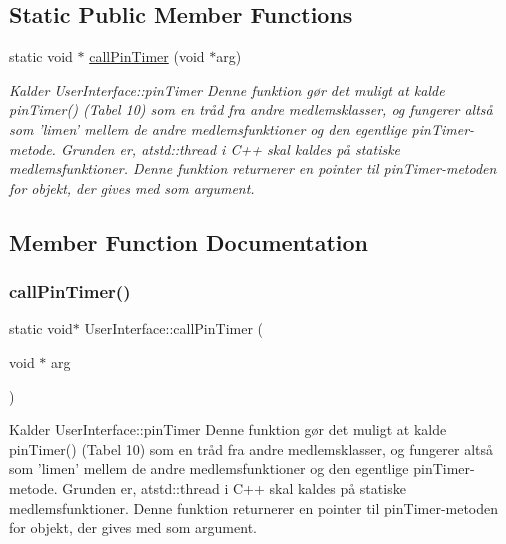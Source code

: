 \subsection*{Static Public Member Functions}
\begin{DoxyCompactItemize}
\item 
static void $\ast$ \hyperlink{classUserInterface_a29bcf3e43b86bda0fcfb9b3bfce93308}{call\+Pin\+Timer} (void $\ast$arg)
\begin{DoxyCompactList}\small\item\em Kalder User\+Interface\+::pin\+Timer Denne funktion gør det muligt at kalde pin\+Timer() (Tabel 10) som en tråd fra andre medlemsklasser, og fungerer altså som ’limen’ mellem de andre medlemsfunktioner og den egentlige pin\+Timer-\/metode. Grunden er, atstd\+::thread i C++ skal kaldes på statiske medlemsfunktioner. Denne funktion returnerer en pointer til pin\+Timer-\/metoden for objekt, der gives med som argument. \end{DoxyCompactList}\end{DoxyCompactItemize}


\subsection{Member Function Documentation}
\mbox{\label{classUserInterface_a29bcf3e43b86bda0fcfb9b3bfce93308}} 
\subsubsection{\texorpdfstring{call\+Pin\+Timer()}{callPinTimer()}}
{\footnotesize\ttfamily static void$\ast$ User\+Interface\+::call\+Pin\+Timer (\begin{DoxyParamCaption}\item[{void $\ast$}]{arg }\end{DoxyParamCaption})\hspace{0.3cm}{\ttfamily [static]}}



Kalder User\+Interface\+::pin\+Timer Denne funktion gør det muligt at kalde pin\+Timer() (Tabel 10) som en tråd fra andre medlemsklasser, og fungerer altså som ’limen’ mellem de andre medlemsfunktioner og den egentlige pin\+Timer-\/metode. Grunden er, atstd\+::thread i C++ skal kaldes på statiske medlemsfunktioner. Denne funktion returnerer en pointer til pin\+Timer-\/metoden for objekt, der gives med som argument. 


